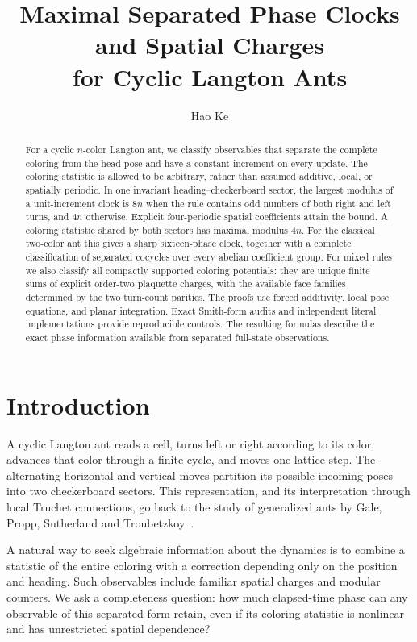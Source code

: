 \documentclass[11pt]{article}
\title{Maximal Separated Phase Clocks and Spatial Charges\\for Cyclic Langton Ants}
\author{Hao Ke}
\date{}
\theoremstyle{definition}
\begin{document}
\maketitle
\begin{abstract}
For a cyclic $n$-color Langton ant, we classify observables that separate the
complete coloring from the head pose and have a constant increment on every
update. The coloring statistic is allowed to be arbitrary, rather than assumed
additive, local, or spatially periodic. In one invariant heading--checkerboard
sector, the largest modulus of a unit-increment clock is $8n$ when the rule
contains odd numbers of both right and left turns, and $4n$ otherwise. Explicit
four-periodic spatial coefficients attain the bound. A coloring statistic
shared by both sectors has maximal modulus $4n$. For the classical two-color
ant this gives a sharp sixteen-phase clock, together with a complete
classification of separated cocycles over every abelian coefficient group.
For mixed rules we also classify all compactly supported coloring potentials:
they are unique finite sums of explicit order-two plaquette charges, with the
available face families determined by the two turn-count parities. The proofs
use forced additivity, local pose equations, and planar integration. Exact
Smith-form audits and independent literal implementations provide reproducible
controls. The resulting formulas describe the exact phase information available from
separated full-state observations.
\end{abstract}

\section{Introduction}
A cyclic Langton ant reads a cell, turns left or right according to its color,
advances that color through a finite cycle, and moves one lattice step.
The alternating horizontal and vertical moves partition its possible incoming
poses into two checkerboard sectors. This representation, and its interpretation
through local Truchet connections, go back to the study of generalized ants by
Gale, Propp, Sutherland and Troubetzkoy~\cite{gale}.

A natural way to seek algebraic information about the dynamics is to combine
a statistic of the entire coloring with a correction depending only on the
position and heading. Such observables include familiar spatial charges and
modular counters. We ask a completeness question: how much elapsed-time phase
can any observable of this separated form retain, even if its coloring
statistic is nonlinear and has unrestricted spatial dependence?
\end{document}
